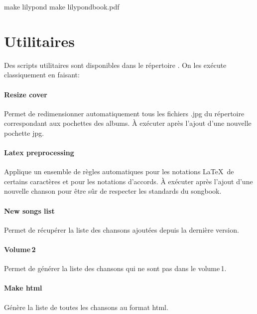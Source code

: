 \documentclass[versionenligne]{framabook}
\begin{document}
\begin{unixcom}
  make lilypond
  make lilypondbook.pdf 
\end{unixcom}


\section{Utilitaires}\label{sect:utilitaires}

Des scripts utilitaires sont disponibles dans le répertoire
. On les exécute classiquement en faisant:


\paragraph{Resize cover}
Permet de redimensionner automatiquement tous les fichiers .jpg du
répertoire  correspondant aux pochettes des albums. À
exécuter après l'ajout d'une nouvelle pochette jpg.

\paragraph{Latex preprocessing}
Applique un ensemble de règles automatiques pour les notations \LaTeX\,
de certains caractères et pour les notations d'accords.
À exécuter après l'ajout d'une nouvelle chanson pour être sûr de
respecter les standards du songbook.

\paragraph{New songs list}
Permet de récupérer la liste des chansons ajoutées depuis la dernière
version.

\paragraph{Volume\,2}
Permet de générer la liste des chansons qui ne sont pas dans le volume\,1.

\paragraph{Make html}
Génère la liste de toutes les chansons au format html.
\end{document}
